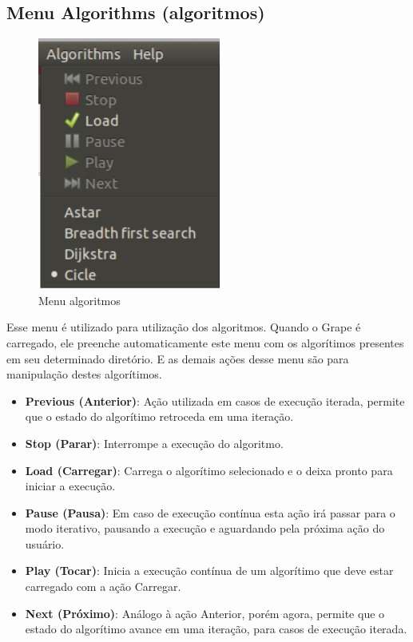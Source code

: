 \documentclass[a4paper]{abnt}
\begin{document}
\subsection{Menu Algorithms (algoritmos)}
\begin{figure}[htb]
    \centering
	\includegraphics[width=6cm]{grape_menu_algorithms.png}
	\caption{Menu algoritmos}
	\label{img_menu_algorithms}
\end{figure}

Esse menu é utilizado para utilização dos algoritmos. Quando o Grape é carregado, ele preenche automaticamente este menu com os algorítimos presentes em seu determinado diretório. E as demais ações desse menu são para manipulação destes algorítimos.

\begin{itemize}
    \item \textbf{Previous (Anterior)}: Ação utilizada em casos de execução iterada, permite que o estado do algorítimo retroceda em uma iteração.
    \item \textbf{Stop (Parar)}: Interrompe a execução do algoritmo.
    \item \textbf{Load (Carregar)}: Carrega o algorítimo selecionado e o deixa pronto para iniciar a execução.
    \item \textbf{Pause (Pausa)}: Em caso de execução contínua esta ação irá passar para o modo iterativo, pausando a execução e aguardando pela próxima ação do usuário.
    \item \textbf{Play (Tocar)}: Inicia a execução contínua de um algorítimo que deve estar carregado com a ação Carregar.
    \item \textbf{Next (Próximo)}: Análogo à ação Anterior, porém agora, permite que o estado do algorítimo avance em uma iteração, para casos de execução iterada.
\end{itemize}
\end{document}
